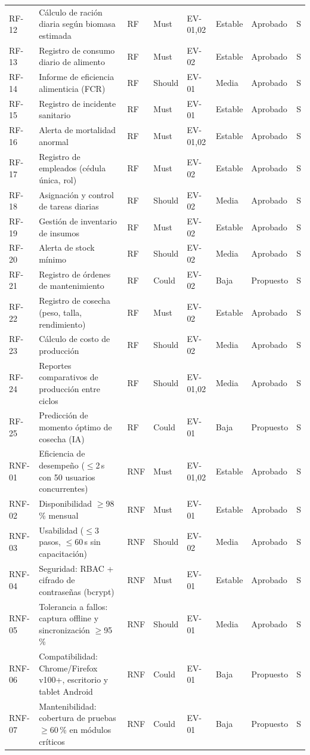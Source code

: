 \documentclass[11pt,a4paper]{report}
\begin{document}
{\begin{longtable}{L{1.1cm}L{4.6cm}L{1.0cm}L{1.3cm}L{1.3cm}L{1.3cm}L{1.4cm}L{1.1cm}}
RF-12 & C\'alculo de raci\'on diaria seg\'un biomasa estimada & RF & Must & EV-01,02 & Estable & Aprobado & S \\
RF-13 & Registro de consumo diario de alimento & RF & Must & EV-02 & Estable & Aprobado & S \\
RF-14 & Informe de eficiencia alimenticia (FCR) & RF & Should & EV-01 & Media & Aprobado & S \\
RF-15 & Registro de incidente sanitario & RF & Must & EV-01 & Estable & Aprobado & S \\
RF-16 & Alerta de mortalidad anormal & RF & Must & EV-01,02 & Estable & Aprobado & S \\
RF-17 & Registro de empleados (c\'edula \'unica, rol) & RF & Must & EV-02 & Estable & Aprobado & S \\
RF-18 & Asignaci\'on y control de tareas diarias & RF & Should & EV-02 & Media & Aprobado & S \\
RF-19 & Gesti\'on de inventario de insumos & RF & Must & EV-02 & Estable & Aprobado & S \\
RF-20 & Alerta de stock m\'inimo & RF & Should & EV-02 & Media & Aprobado & S \\
RF-21 & Registro de \'ordenes de mantenimiento & RF & Could & EV-02 & Baja & Propuesto & S \\
RF-22 & Registro de cosecha (peso, talla, rendimiento) & RF & Must & EV-02 & Estable & Aprobado & S \\
RF-23 & C\'alculo de costo de producci\'on & RF & Should & EV-02 & Media & Aprobado & S \\
RF-24 & Reportes comparativos de producci\'on entre ciclos & RF & Should & EV-01,02 & Media & Aprobado & S \\
RF-25 & Predicci\'on de momento \'optimo de cosecha (IA) & RF & Could & EV-01 & Baja & Propuesto & S \\
\midrule
RNF-01 & Eficiencia de desempe\~no ($\leq$2\,s con 50 usuarios concurrentes) & RNF & Must & EV-01,02 & Estable & Aprobado & S \\
RNF-02 & Disponibilidad $\geq$98\,\% mensual & RNF & Must & EV-01 & Estable & Aprobado & S \\
RNF-03 & Usabilidad ($\leq$3 pasos, $\leq$60\,s sin capacitaci\'on) & RNF & Should & EV-02 & Media & Aprobado & S \\
RNF-04 & Seguridad: RBAC + cifrado de contrase\~nas (bcrypt) & RNF & Must & EV-01 & Estable & Aprobado & S \\
RNF-05 & Tolerancia a fallos: captura offline y sincronizaci\'on $\geq$95\,\% & RNF & Should & EV-01 & Media & Aprobado & S \\
RNF-06 & Compatibilidad: Chrome/Firefox v100+, escritorio y tablet Android & RNF & Could & EV-01 & Baja & Propuesto & S \\
RNF-07 & Mantenibilidad: cobertura de pruebas $\geq$60\,\% en m\'odulos cr\'iticos & RNF & Could & EV-01 & Baja & Propuesto & S \\
\end{longtable}
}
\end{document}
